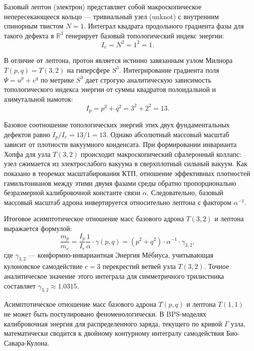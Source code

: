\documentclass[11pt,a4paper]{article}
\begin{document}
Базовый лептон (электрон) представляет собой макроскопическое непересекающееся кольцо — тривиальный узел (unknot) с внутренним спинорным твистом $N=1$. Интеграл квадрата продольного градиента фазы для такого дефекта в $\mathbb{R}^3$ генерирует базовый топологический индекс энергии:
\begin{equation}
	I_e = N^2 = 1^2 = 1.
\end{equation}

В отличие от лептона, протон является истинно завязанным узлом Милнора $T(p,q) = T(3,2)$ на гиперсфере $S^3$. Интегрирование градиента поля $\Psi = u^p + v^q$ по метрике $S^3$ дает строгую аналитическую зависимость топологического индекса энергии от суммы квадратов полоидальной и азимутальной намоток:
\begin{equation}
	I_p = p^2 + q^2 = 3^2 + 2^2 = 13.
\end{equation}

Базовое соотношение топологических энергий этих двух фундаментальных дефектов  равно $I_p / I_e = 13 / 1 = 13$. 
Однако абсолютный массовый масштаб зависит от плотности вакуумного конденсата. При формировании инварианта Хопфа для узла $T(3,2)$ происходит макроскопический сфалеронный коллапс: узел сжимается из электрослабого вакуума в сверхплотный сильный вакуум. Как показано в теоремах масштабирования КТП, отношение эффективных плотностей гамильтонианов между этими двумя фазами среды обратно пропорционально безразмерной калибровочной константе связи $\alpha$. Следовательно, базовый массовый масштаб адрона инвертируется относительно лептона с фактором $\alpha^{-1}$.

Итоговое асимптотическое отношение масс базового адрона $T(3,2)$ и лептона выражается формулой:
\begin{equation}
	\frac{m_p}{m_e} = \frac{I_p}{I_e} \frac{1}{\alpha} \cdot \gamma(p,q) = (p^2 + q^2) \cdot \alpha^{-1} \cdot \gamma_{3,2},
	\label{eq:mass_ratio_proton}
\end{equation}
где $\gamma_{3,2}$ — конформно-инвариантная Энергия Мёбиуса, учитывающая кулоновское самодействие $c = 3$ перекрестий ветвей узла $T(3,2)$. Точное аналитическое значение этого интеграла для симметричного трилистника составляет $\gamma_{3,2} \approx 1.0315$.

Асимптотическое отношение масс базового адрона $T(p,q)$ и лептона $T(1,1)$ не может быть постулировано феноменологически. В BPS-моделях калибровочная энергия для распределенного заряда, текущего по кривой $\Gamma$ узла, математически сводится к двойному контурному интегралу самодействия Био-Савара-Кулона.
\end{document}
